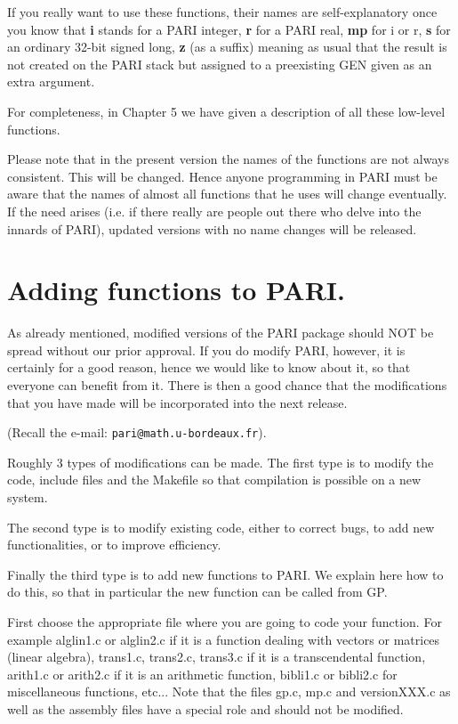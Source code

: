 If you really want to use these functions, their names are self-explanatory once
you know that {\bf i} stands for a PARI integer, {\bf r} for a PARI real,
{\bf mp} for i or r, {\bf s} for an ordinary 32-bit signed long, {\bf z} (as a
suffix) meaning as usual that the result is not created on the PARI stack but
assigned to a preexisting GEN given as an extra argument.

For completeness, in Chapter 5 we have given a description of all these
low-level functions.

Please note that in the present version \vers{} the names of the functions are 
not always consistent. This will be changed. Hence anyone programming
in PARI must be aware that the names of almost all functions that he uses will
change eventually. If the need arises (i.e. if there really are people out 
there who delve into the innards of PARI), updated versions with no name 
changes will be released.

\section{Adding functions to PARI.}

As already mentioned, modified versions of the PARI package should NOT be 
spread without our prior approval. If you do modify PARI, however, it is
certainly for a good reason, hence we would like to know about it, so that
everyone can benefit from it. There is then a good chance that the 
modifications that you have made will be incorporated into the next release.

(Recall the e-mail: {\tt pari@math.u-bordeaux.fr}).

Roughly 3 types of modifications can be made. The first type is to modify the
code, include files and the Makefile so that compilation is possible on a new
system.

The second type is to modify existing code, either to correct bugs, to
add new functionalities, or to improve efficiency.

Finally the third type is to add new functions to PARI. We explain here how
to do this, so that in particular the new function can be called from GP.

First choose the appropriate file where you are going to code your function.
For example alglin1.c or alglin2.c if it is a function dealing with vectors
or matrices (linear algebra), trans1.c, trans2.c, trans3.c if it is a
transcendental function, arith1.c or arith2.c if it is an arithmetic function,
bibli1.c or bibli2.c for miscellaneous functions, etc... Note that the files
gp.c, mp.c and versionXXX.c as well as the assembly files have a special role
and should not be modified. 

